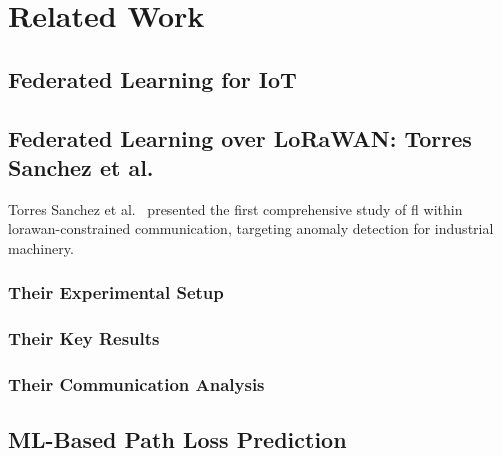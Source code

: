 \chapter{Related Work}
\label{ch:related-work}

\section{Federated Learning for IoT}
\label{sec:fl-iot}

\section{Federated Learning over LoRaWAN: Torres Sanchez et al.}
\label{sec:torres-sanchez}

Torres Sanchez et al.~\cite{torressanchez2024federated} presented the first comprehensive study of \gls{fl} within \gls{lorawan}-constrained communication, targeting anomaly detection for industrial machinery.

\subsection{Their Experimental Setup}

\subsection{Their Key Results}

\subsection{Their Communication Analysis}

\section{ML-Based Path Loss Prediction}
\label{sec:ml-pathloss-related}

